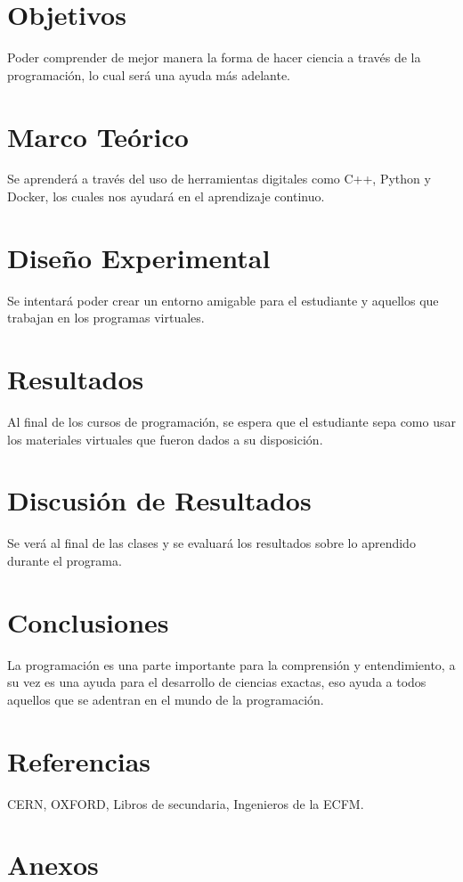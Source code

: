 \documentclass[12pt]{article}
\begin{document}
\section{Objetivos}
\textrm{Poder comprender de mejor manera la forma de hacer ciencia a través de la programación, lo cual será una ayuda más adelante.}

\section{Marco Teórico}
\textrm{Se aprenderá a través del uso de herramientas digitales como C++, Python y Docker, los cuales nos ayudará en el aprendizaje continuo.}

\section{Diseño Experimental}
\textrm{Se intentará poder crear un entorno amigable para el estudiante y aquellos que trabajan en los programas virtuales.}

\section{Resultados}
\textrm{Al final de los cursos de programación, se espera que el estudiante sepa como usar los materiales virtuales que fueron dados a su disposición.}

\section{Discusión de Resultados}
\textrm{Se verá al final de las clases y se evaluará los resultados sobre lo aprendido durante el programa.}

\section{Conclusiones}
\textrm{La programación es una parte importante para la comprensión y entendimiento, a su vez es una ayuda para el desarrollo de ciencias exactas, eso ayuda a todos aquellos que se adentran en el mundo de la programación. }

\section{Referencias}
\textrm{CERN, OXFORD, Libros de secundaria, Ingenieros de la ECFM.}

\section{Anexos}
\end{document}
